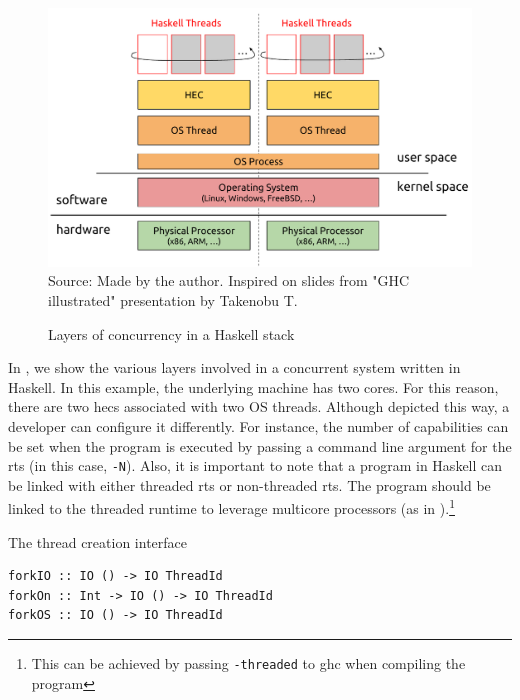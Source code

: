 \begin{figure}[htp]
  \centering
  \caption{Layers of concurrency in a Haskell stack}
  \includegraphics[width=\columnwidth]{images/haskell-concurrency-layers}
  \footnotesize{Source: Made by the author. Inspired on slides from "GHC illustrated" presentation by Takenobu T.}
  \label{fig:haskell-conc-layers}
\end{figure}

In , we show the various layers involved in a concurrent system written in Haskell. In this example, the underlying machine has two cores. For this reason, there are two \acp{hec} associated with two OS threads. Although depicted this way, a developer can configure it differently. For instance, the number of capabilities can be set when the program is executed  by passing a command line argument for the \ac{rts} (in this case, \texttt{-N}). Also, it is important to note that a program in Haskell can be linked with either threaded \ac{rts} or non-threaded \ac{rts}. The program should be linked to the threaded runtime to leverage multicore processors (as in ).\footnote{This can be achieved by passing \texttt{-threaded} to \ac{ghc} when compiling the program}

\begin{listing}
  \caption{The thread creation interface}
  \begin{verbatim}
forkIO :: IO () -> IO ThreadId
forkOn :: Int -> IO () -> IO ThreadId
forkOS :: IO () -> IO ThreadId
  \end{verbatim}
  \label{code:fork-sig}
\end{listing}

